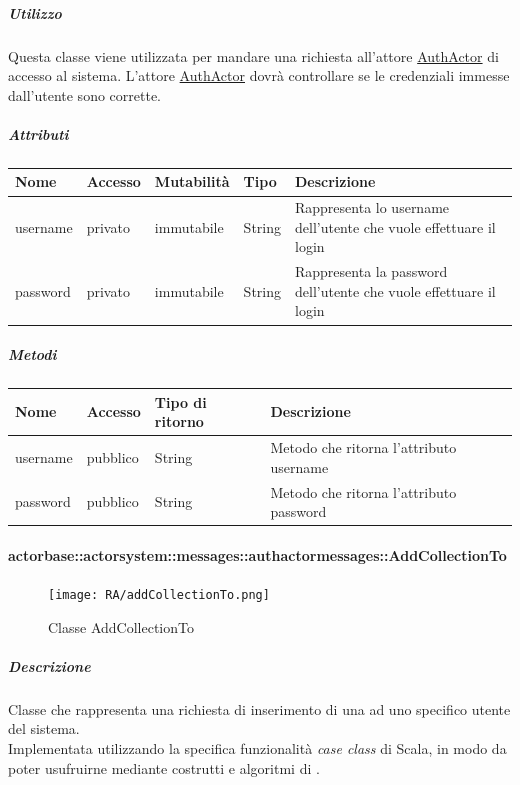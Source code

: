 \documentclass{scalatekids-article}
\begin{document}
\subparagraph{Utilizzo}
Questa classe viene utilizzata per mandare una richiesta all'attore
\hyperref[sec:actorbase::actorsystem::actors::authactor::AuthActor]{AuthActor}
di accesso al sistema. L'attore \hyperref[sec:actorbase::actorsystem::actors::authactor::AuthActor]{AuthActor}
dovrà controllare se le credenziali immesse dall'utente sono corrette.

\subparagraph{Attributi}
\begin{tabular}{| p{2cm} | p{1.5cm} | p{2cm} | p{3cm} | p{8.5cm} |}
  \hline
  Nome & Accesso & Mutabilità & Tipo & Descrizione\\
  \hline
  username & privato & immutabile & String & Rappresenta lo username dell'utente che vuole effettuare il login \\
  \hline
  password & privato & immutabile & String & Rappresenta la password dell'utente che vuole effettuare il login \\
  \hline
\end{tabular}

\subparagraph{Metodi}
\begin{tabular}{| l | l | l | l |}
  \hline
  Nome & Accesso & Tipo di ritorno & Descrizione\\
  \hline
  username & pubblico & String & Metodo che ritorna l'attributo username\\
  \hline
  password & pubblico & String & Metodo che ritorna l'attributo password\\
  \hline
\end{tabular}

\paragraph{actorbase::actorsystem::messages::authactormessages::AddCollectionTo}
\label{sec:actorbase::actorsystem::messages::authactormessages::AddCollectionTo}

\begin{figure}[H]
  \begin{center}
    \texttt{[image: RA/addCollectionTo.png]}
    \caption{Classe AddCollectionTo}
  \end{center}
\end{figure}

\subparagraph{Descrizione}
Classe che rappresenta una richiesta di inserimento di una  ad
uno specifico utente del sistema.\\ Implementata utilizzando la specifica
funzionalità \textit{case class} di Scala, in modo da poter usufruirne mediante
costrutti e algoritmi di .
\end{document}
